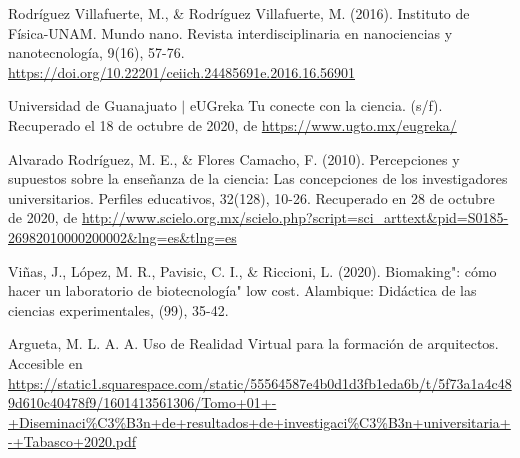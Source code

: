 \documentclass[12pt]{article}
\begin{document}
\begin{thebibliography}{X}
	\bibitem[Rodriguez, 2016]{}  Rodríguez Villafuerte, M., \& Rodríguez Villafuerte, M. (2016). Instituto de Física-UNAM. Mundo nano. Revista interdisciplinaria en nanociencias y nanotecnología, 9(16), 57-76. \url{https://doi.org/10.22201/ceiich.24485691e.2016.16.56901}
	
	 Universidad de Guanajuato $|$ eUGreka Tu conecte con la ciencia. (s/f). Recuperado el 18 de octubre de 2020, de \url{https://www.ugto.mx/eugreka/}
	
	\bibitem[Alvarado, 2010]{} Alvarado Rodríguez, M. E., \& Flores Camacho, F. (2010). Percepciones y supuestos sobre la enseñanza de la ciencia: Las concepciones de los investigadores universitarios. Perfiles educativos, 32(128), 10-26. Recuperado en 28 de octubre de 2020, de \url{http://www.scielo.org.mx/scielo.php?script=sci_arttext&pid=S0185-26982010000200002&lng=es&tlng=es}
	
	 Viñas, J., López, M. R., Pavisic, C. I., \& Riccioni, L. (2020). Biomaking": cómo hacer un laboratorio de biotecnología" low cost. Alambique: Didáctica de las ciencias experimentales, (99), 35-42.
	
	 Argueta, M. L. A. A. Uso de Realidad Virtual para la formación de arquitectos. Accesible en \url{https://static1.squarespace.com/static/55564587e4b0d1d3fb1eda6b/t/5f73a1a4c489d610c40478f9/1601413561306/Tomo+01+-+Diseminaci%C3%B3n+de+resultados+de+investigaci%C3%B3n+universitaria+-+Tabasco+2020.pdf}


\end{thebibliography}


\appendix\newpage
\end{document}
